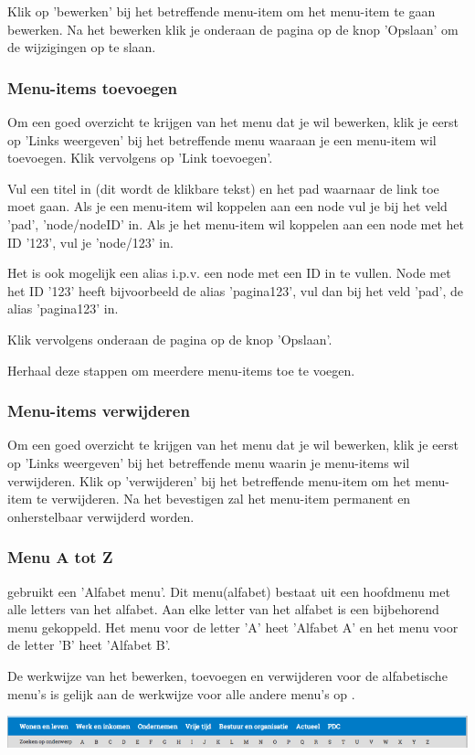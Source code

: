 Klik op 'bewerken' bij het betreffende menu-item om het menu-item te gaan bewerken. Na het bewerken klik je onderaan de pagina op de knop 'Opslaan' om de wijzigingen op te slaan.


\subsubsection{Menu-items toevoegen}\label{menuitemstoevoegen}

Om een goed overzicht te krijgen van het menu dat je wil bewerken, klik je eerst op 'Links weergeven' bij het betreffende menu waaraan je een menu-item wil toevoegen. Klik vervolgens op 'Link toevoegen'. 

Vul een titel in (dit wordt de klikbare tekst) en het pad waarnaar de link toe moet gaan. Als je een menu-item wil koppelen aan een node vul je bij het veld 'pad', 'node/nodeID' in. Als je het menu-item wil koppelen aan een node met het ID '123', vul je 'node/123' in. 

Het is ook mogelijk een alias i.p.v. een node met een ID in te vullen. Node met het ID '123' heeft bijvoorbeeld de alias 'pagina123', vul dan bij het veld 'pad', de alias 'pagina123' in. 

Klik vervolgens onderaan de pagina op de knop 'Opslaan'.

Herhaal deze stappen om meerdere menu-items toe te voegen.  

\subsubsection{Menu-items verwijderen}\label{menuitemsverwijderen}

Om een goed overzicht te krijgen van het menu dat je wil bewerken, klik je eerst op 'Links weergeven' bij het betreffende menu waarin je menu-items wil verwijderen. Klik op 'verwijderen' bij het betreffende menu-item om het menu-item te verwijderen. Na het bevestigen zal het menu-item permanent en onherstelbaar verwijderd worden.

\subsubsection{Menu A tot Z}\label{menuatotz}

\drupalpath gebruikt een 'Alfabet menu'. Dit menu(alfabet) bestaat uit een hoofdmenu met alle letters van het alfabet. Aan elke letter van het alfabet is een bijbehorend menu gekoppeld. Het menu voor de letter 'A' heet 'Alfabet A' en het menu voor de letter 'B' heet 'Alfabet B'.

De werkwijze van het bewerken, toevoegen en verwijderen voor de alfabetische menu's is gelijk aan de werkwijze voor alle andere menu's op \drupalpath{}.

\bigskip

\begin{center}
	\includegraphics[width=\textwidth]{img/menu3.png}
\end{center}